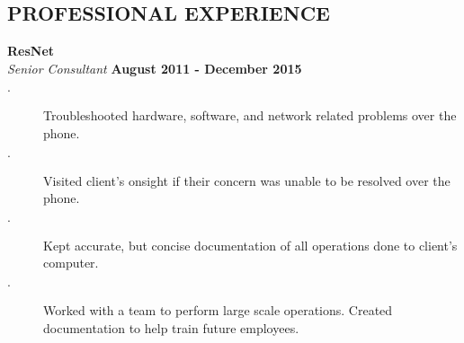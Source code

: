 \documentclass[margin,line]{resume}
\begin{document}
\begin{resume}
\vspace{1mm}

\sectionline
\vspace{2mm}
    \section{\mysidestyle \textbf{\large{P}\small{ROFESSIONAL} \large{E}\small{XPERIENCE}}}

    \textbf{\listing ResNet} \vspace{2mm}\\\vspace{1mm}%
    \textsl{Senior Consultant} \hfill \textbf{August 2011 - December 2015}\\
\begin{description}
  \item[$\cdot$] Troubleshooted hardware, software, and network related problems over the phone.
 \item[$\cdot$] Visited client’s onsight if their concern was unable to be resolved over the phone. 
\item[$\cdot$] Kept accurate, but concise documentation of all operations done to client’s computer. 
\item[$\cdot$] Worked with a team to perform large scale operations. Created documentation to help train future employees.



\end{description}









\end{resume}
\end{document}
